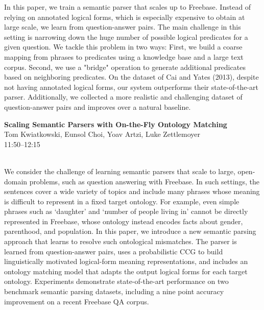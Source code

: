 \documentclass[twoside,makeidx]{book}
\begin{document}
\nopagebreak%
\noindent%
{\small In this paper, we train a semantic parser that scales up to Freebase. Instead of relying on annotated logical forms, which is especially expensive to obtain at large scale, we learn from question-answer pairs. The main challenge in this setting is narrowing down the huge number of possible logical predicates for a given question. We tackle this problem in two ways: First, we build a coarse mapping from phrases to predicates using a knowledge base and a large text corpus. Second, we use a "bridge" operation to generate additional predicates based on neighboring predicates. On the dataset of Cai and Yates (2013), despite not having annotated logical forms, our system outperforms their state-of-the-art parser. Additionally, we collected a more realistic and challenging dataset of question-answer pairs and improves over a natural baseline.}
\par\vspace{2em}\noindent%
\begin{minipage}{\linewidth}%
\begin{center}
\textbf{\normalsize Scaling Semantic Parsers with On-the-Fly Ontology Matching}\\
\normalsize  Tom Kwiatkowski,  Eunsol Choi,  Yoav Artzi,  Luke Zettlemoyer\\
{\small 11:50--12:15}\\
\end{center}
\end{minipage}\\[0.5em]
\nopagebreak%
\noindent%
{\small We consider the challenge of learning semantic parsers that scale to large, open-domain problems, such as question answering  with Freebase. In such settings, the sentences cover a wide variety of topics and include many  phrases whose meaning is difficult to represent in a fixed target ontology. For example, even simple phrases such as `daughter' and `number of people living in' cannot be directly represented in Freebase, whose ontology instead encodes facts about gender, parenthood, and population. In this paper, we introduce a new semantic parsing approach that learns to resolve such ontological mismatches. The parser is learned from question-answer pairs, uses a probabilistic CCG to build linguistically motivated logical-form meaning representations, and includes an ontology matching model that adapts the output logical forms for each target ontology.  Experiments demonstrate state-of-the-art performance on two benchmark semantic parsing datasets, including a nine point accuracy improvement on a recent Freebase QA corpus.}
\end{document}
